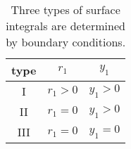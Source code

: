 \begin{table}[htbp]
\caption{Three types of surface integrals are determined by boundary conditions.}
\begin{center}
\begin{tabular}{ccc}
    type & $r_{1}$ & $y_{1}$ \\\hline
    I & $r_{1}>0$ & $y_{1}>0$ \\
    II & $r_{1}=0$ & $y_{1}>0$ \\
    III & $r_{1}=0$ & $y_{1}=0$ \\
\end{tabular}
\end{center}
\label{tab:integral types}
\end{table}%

\endinput